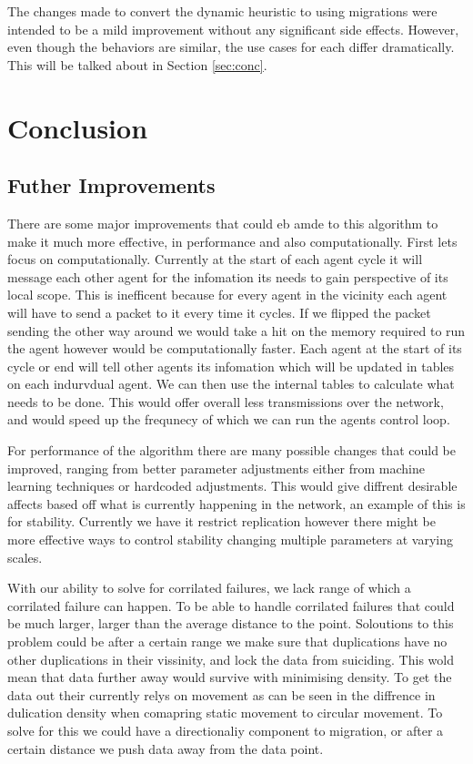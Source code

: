 \documentclass{UoYCSproject}
\begin{document}
The changes made to convert the dynamic heuristic to using migrations were intended to be a mild improvement without any significant side effects. 
However, even though the behaviors are similar, the use cases for each differ dramatically. 
This will be talked about in Section \ref{sec:conc}.



\chapter{Conclusion}
\label{cha:conclusion}

\section{Futher Improvements}
\label{sec:further}

There are some major improvements that could eb amde to this algorithm to make it much more effective, in performance and also computationally.
First lets focus on computationally.
Currently at the start of each agent cycle it will message each other agent for the infomation its needs to gain perspective of its local scope.
This is inefficent because for every agent in the vicinity each agent will have to send a packet to it every time it cycles.
If we flipped the packet sending the other way around we would take a hit on the memory required to run the agent however would be computationally faster.
Each agent at the start of its cycle or end will tell other agents its infomation which will be updated in tables on each indurvdual agent.
We can then use the internal tables to calculate what needs to be done.
This would offer overall less transmissions over the network, and would speed up the frequnecy of which we can run the agents control loop.

For performance of the algorithm there are many possible changes that could be improved, ranging from better parameter adjustments either from machine learning techniques or hardcoded adjustments.
This would give diffrent desirable affects based off what is currently happening in the network, an example of this is for stability.
Currently we have it restrict replication however there might be more effective ways to control stability changing multiple parameters at varying scales.

With our ability to solve for corrilated failures, we lack range of which a corrilated failure can happen.
To be able to handle corrilated failures that could be much larger, larger than the average distance to the point.
Soloutions to this problem could be after a certain range we make sure that duplications have no other duplications in their vissinity, and lock the data from suiciding.
This wold mean that data further away would survive with minimising density.
To get the data out their currently relys on movement as can be seen in the diffrence in dulication density when comapring static movement to circular movement.
To solve for this we could have a directionaliy component to migration, or after a certain distance we push data away from the data point.
\end{document}

